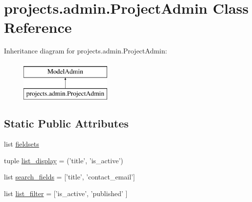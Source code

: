 \hypertarget{classprojects_1_1admin_1_1_project_admin}{\section{projects.\-admin.\-Project\-Admin Class Reference}
\label{classprojects_1_1admin_1_1_project_admin}
}
Inheritance diagram for projects.\-admin.\-Project\-Admin\-:\begin{figure}[H]
\begin{center}
\leavevmode
\includegraphics[height=2.000000cm]{classprojects_1_1admin_1_1_project_admin}
\end{center}
\end{figure}
\subsection*{Static Public Attributes}
\begin{DoxyCompactItemize}
\item 
list \hyperlink{classprojects_1_1admin_1_1_project_admin_a1fdb2514f49cffed93941b51fa1cd445}{fieldsets}
\item 
tuple \hyperlink{classprojects_1_1admin_1_1_project_admin_ad089d0d056748a3ec8878f92fa050b0d}{list\-\_\-display} = ('title', 'is\-\_\-active')
\item 
list \hyperlink{classprojects_1_1admin_1_1_project_admin_a02fd5dcdc2f73478870a2c63328910ae}{search\-\_\-fields} = \mbox{[}'title', 'contact\-\_\-email'\mbox{]}
\item 
list \hyperlink{classprojects_1_1admin_1_1_project_admin_a7a0b71d041c73c01049e69b68d3f1ab0}{list\-\_\-filter} = \mbox{[}'is\-\_\-active', 'published' \mbox{]}
\end{DoxyCompactItemize}


